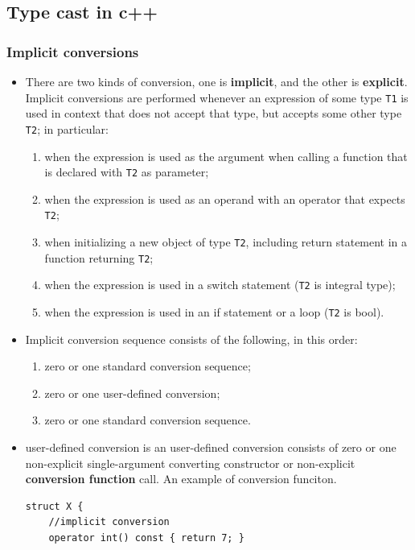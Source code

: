 \documentclass[a4paper,11pt,twoside]{book}
\begin{document}
\subsection{Type cast in c++}
\subsubsection{Implicit conversions}
\begin{itemize}
\item There are two kinds of conversion, one is \textbf{implicit}, and the other is \textbf{explicit}. Implicit conversions are performed whenever an expression of some type \texttt{T1} is used in context that does not accept that type, but accepts some other type \texttt{T2}; in particular:
	\begin{enumerate}
		\item when the expression is used as the argument when calling a function that is declared with \texttt{T2} as parameter;
		\item when the expression is used as an operand with an operator that expects \texttt{T2};
		\item when initializing a new object of type \texttt{T2}, including return statement in a function returning \texttt{T2};
		\item when the expression is used in a switch statement (\texttt{T2} is integral type);
		\item when the expression is used in an if statement or a loop (\texttt{T2} is bool).
	\end{enumerate}
	
	\item Implicit conversion sequence consists of the following, in this order:
	\begin{enumerate}
		\item zero or one standard conversion sequence;
		\item zero or one user-defined conversion;
		\item zero or one standard conversion sequence.
	\end{enumerate}

	\item user-defined conversion is an user-defined conversion consists of zero or one non-explicit single-argument converting constructor or non-explicit \textbf{conversion function} call. An example of conversion funciton. 
\begin{lstlisting}[numbers=none]	
struct X {
	//implicit conversion
	operator int() const { return 7; }
	

\end{lstlisting}
\end{itemize}
\end{document}
